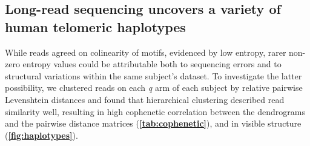 \documentclass{article}
\begin{document}
\subsection*{Long-read sequencing uncovers a variety of human telomeric haplotypes}
    While reads agreed on colinearity of motifs, evidenced by low entropy,
        rarer non-zero entropy values could be attributable both to sequencing errors
        and to structural variations within the same subject's dataset.
    To investigate the latter possibility,
        we clustered reads on each \textit{q} arm of each subject by relative pairwise Levenshtein distances \parencite{levenshtein}
        and found that hierarchical clustering described read similarity well,
            resulting in high cophenetic correlation between the dendrograms and the pairwise distance matrices
                (\textbf{\autoref{tab:cophenetic}}),
            and in visible structure (\textbf{\autoref{fig:haplotypes}}).
\end{document}

